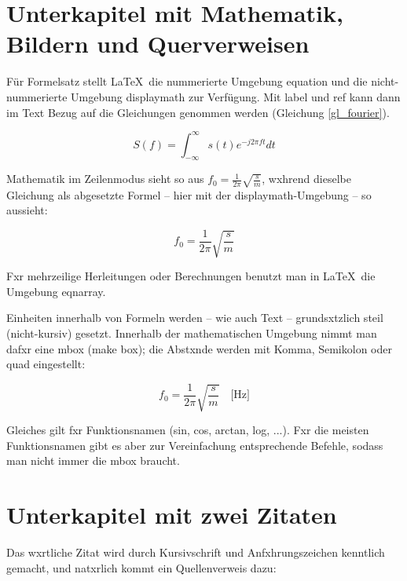         \section{Unterkapitel mit Mathematik, Bildern und Querverweisen}

            Für Formelsatz stellt \LaTeX\ die nummerierte Umgebung equation und die nicht-nummerierte Umgebung displaymath zur Verfügung. Mit label und ref kann dann im Text Bezug auf die Gleichungen genommen werden (Gleichung \ref{gl_fourier}). 

            \begin{equation}\label{gl_fourier}
            S(f) = \int_{-\infty}^{\infty} s(t)e^{-j 2 \pi f t}dt
            \end{equation}

            Mathematik im Zeilenmodus sieht so aus $f_0 = \frac{1}{2\pi} \sqrt{\frac{s}{m}}$, wxhrend dieselbe Gleichung als abgesetzte Formel -- hier mit der displaymath-Umgebung -- so aussieht: 

            \begin{displaymath}
            f_0 = \frac{1}{2\pi} \sqrt{\frac{s}{m}} 
            \end{displaymath}

            Fxr mehrzeilige Herleitungen oder Berechnungen benutzt man in \LaTeX\ die Umgebung eqnarray.

            Einheiten innerhalb von Formeln werden -- wie auch Text -- grundsxtzlich steil (nicht-kursiv) gesetzt. Innerhalb der mathematischen Umgebung nimmt man dafxr eine mbox (make box); die Abstxnde werden mit Komma, Semikolon oder quad eingestellt:

            \begin{displaymath}
            f_0 = \frac{1}{2\pi} \sqrt{\frac{s}{m}} \quad \mbox{[Hz]}
            \end{displaymath}

            Gleiches gilt fxr Funktionsnamen (sin, cos, arctan, log, ...). Fxr die meisten Funktionsnamen gibt es aber zur Vereinfachung entsprechende Befehle, sodass man nicht immer die mbox braucht.


        \section{Unterkapitel mit zwei Zitaten}

            Das wxrtliche Zitat wird durch Kursivschrift und Anfxhrungszeichen kenntlich gemacht, und natxrlich kommt ein Quellenverweis dazu:

